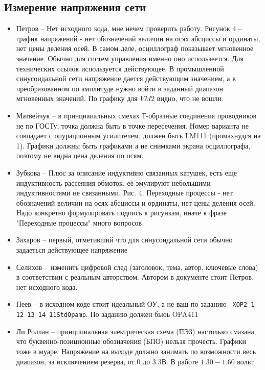 \subsection*{Измерение напряжения сети}
\begin{itemize}
\item Петров -- Нет исходного кода, мне нечем проверить работу. Рисунок 4 -- график напряжений - нет обозначений величин на осях абсциссы и ординаты, нет цены деления осей.
В самом деле, осциллограф показывает мгновенное значение. Обычно для систем управления именно оно использеется. Для технических ссылок используется действующее.
В промышленной синусоидальной сети напряжение дается действующим значением,
а в преобразованном по амплитуде нужно войти в заданный диапазон мгновенных значений. По графику для $VM2$ видно, что не вошли. 
\item Матвейчук  -- в принциаиальных смехах Т-образные соединения проводников не по ГОСТу, точка должна быть в точке пересечения. Номер варианта не совпадает с опурационным усилителем.
должен быть LM111 (промахнудся на 1). Графики должны быть графиками а не снимками экрана осциллографа, поэтому не видна цена деления по осям.

\item Зубкова -- Плюс за описание индуктивно связанных катушек, есть еще индуктивность рассеяния обмоток, её эмулируют небольшими индуктивностями не связанными.
Рис. 4. Переходные процессы - нет обозначений величин на осях абсциссы и ординаты, нет цены деления осей.
Надо конкретно формулировать подпись к рисункам, иначе  к фразе "Переходные процессы" много вопросов.


\item Захаров -- первый, отметивший что для синусоидальной сети обычно задаеться действующее напряжение

\item Селихов -- изменить цифровой след (заголовок, тема, автор, ключевые слова) в соответствии с реальным авторством. Автором в документе стоит Петров. нет исходного кода.

\item Пеев -- в исходном коде стоит идеальный ОУ, а не ваш по заданию
\texttt{ XOP2         1 12 13 14 11StdOpamp}. По заданию должен быоь OPA411
\item  Ли Роллан -- принципиальная электрическая схема (ПЭ3) настолько смазана, что буквенно-позиционные обозначения (БПО) нельзя прочесть. Графики тоже в муаре. 
Напряжение на выходе должно занимать по возможности весь диапазон, за исключением резерва, от 0 до 3.3В. В работе $1.30-1.60$ вольт
\end{itemize}



